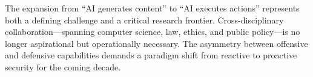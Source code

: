 The expansion from ``AI generates content'' to ``AI executes actions'' represents both a defining challenge and a critical research frontier. Cross-disciplinary collaboration---spanning computer science, law, ethics, and public policy---is no longer aspirational but operationally necessary. The asymmetry between offensive and defensive capabilities demands a paradigm shift from reactive to proactive security for the coming decade.
